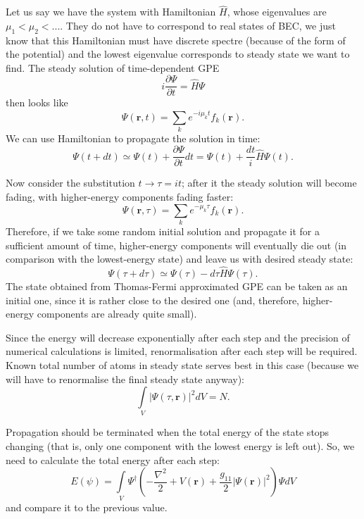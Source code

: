 \documentclass[12pt,notitlepage]{report}
\begin{document}
Let us say we have the system with Hamiltonian $\hat{H}$, whose eigenvalues are $\mu_1 < \mu_2 < ...$. They do not have to correspond to real states of BEC, we just know that this Hamiltonian must have discrete spectre (because of the form of the potential) and the lowest eigenvalue corresponds to steady state we want to find. The steady solution of time-dependent GPE
\[ i \frac{\partial \Psi}{\partial t} = \hat{H} \Psi \]
then looks like
\[ \Psi(\mathbf{r}, t) = \sum_k e^{-i \mu_k t} f_k(\mathbf{r}). \]
We can use Hamiltonian to propagate the solution in time:
\[ 
\Psi(t + dt) \simeq \Psi(t) + \frac{\partial \Psi}{\partial t} dt =
\Psi(t) + \frac{dt}{i} \hat{H} \Psi(t).
\]

Now consider the substitution $t \rightarrow \tau = it$; after it the steady solution will become fading, with higher-energy components fading faster:
\begin{equation}
\label{split_step_steady_state:general_solution_imaginary_time}
\Psi(\mathbf{r}, \tau) = \sum_k e^{-\mu_k \tau} f_k(\mathbf{r}).
\end{equation}
Therefore, if we take some random initial solution and propagate it for a sufficient amount of time, higher-energy components will eventually die out (in comparison with the lowest-energy state) and leave us with desired steady state:
\begin{equation}
\label{split_step_steady_state:iterative_process}
\Psi(\tau + d\tau) \simeq \Psi(\tau) - d\tau \hat{H} \Psi(\tau).
\end{equation}
The state obtained from Thomas-Fermi approximated GPE can be taken as an initial one, since it is rather close to the desired one (and, therefore, higher-energy components are already quite small).

Since the energy will decrease exponentially after each step and the precision of numerical calculations is limited, renormalisation after each step will be required. Known total number of atoms in steady state serves best in this case (because we will have to renormalise the final steady state anyway):
\[ \int\limits_V \vert \Psi(\tau, \mathbf{r}) \vert^2 dV = N. \]

Propagation should be terminated when the total energy of the state stops changing (that is, only one component with the lowest energy is left out). So, we need to calculate the total energy after each step:
\[ E(\psi) = \int\limits_V \Psi^\dagger \left(
-\frac{\nabla^2}{2} + V(\mathbf{r}) + \frac{g_{11}}{2} \vert \Psi(\mathbf{r}) \vert^2 \right) \Psi dV \]
and compare it to the previous value.
\end{document}
